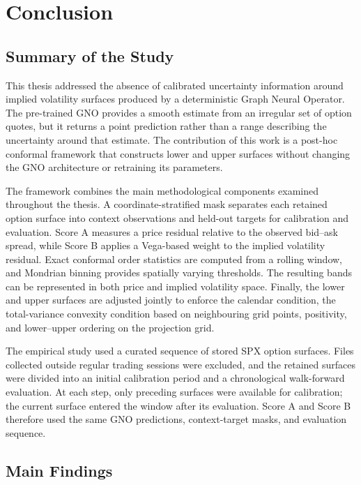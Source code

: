 \chapter{Conclusion}
\label{chap:conclusion}

\section{Summary of the Study}

This thesis addressed the absence of calibrated uncertainty information around implied volatility surfaces produced by a deterministic Graph Neural Operator. The pre-trained GNO provides a smooth estimate from an irregular set of option quotes, but it returns a point prediction rather than a range describing the uncertainty around that estimate. The contribution of this work is a post-hoc conformal framework that constructs lower and upper surfaces without changing the GNO architecture or retraining its parameters.

The framework combines the main methodological components examined throughout the thesis. A coordinate-stratified mask separates each retained option surface into context observations and held-out targets for calibration and evaluation. Score A measures a price residual relative to the observed bid--ask spread, while Score B applies a Vega-based weight to the implied volatility residual. Exact conformal order statistics are computed from a rolling window, and Mondrian binning provides spatially varying thresholds. The resulting bands can be represented in both price and implied volatility space. Finally, the lower and upper surfaces are adjusted jointly to enforce the calendar condition, the total-variance convexity condition based on neighbouring grid points, positivity, and lower--upper ordering on the projection grid.

The empirical study used a curated sequence of stored SPX option surfaces. Files collected outside regular trading sessions were excluded, and the retained surfaces were divided into an initial calibration period and a chronological walk-forward evaluation. At each step, only preceding surfaces were available for calibration; the current surface entered the window after its evaluation. Score A and Score B therefore used the same GNO predictions, context-target masks, and evaluation sequence.

\section{Main Findings}

